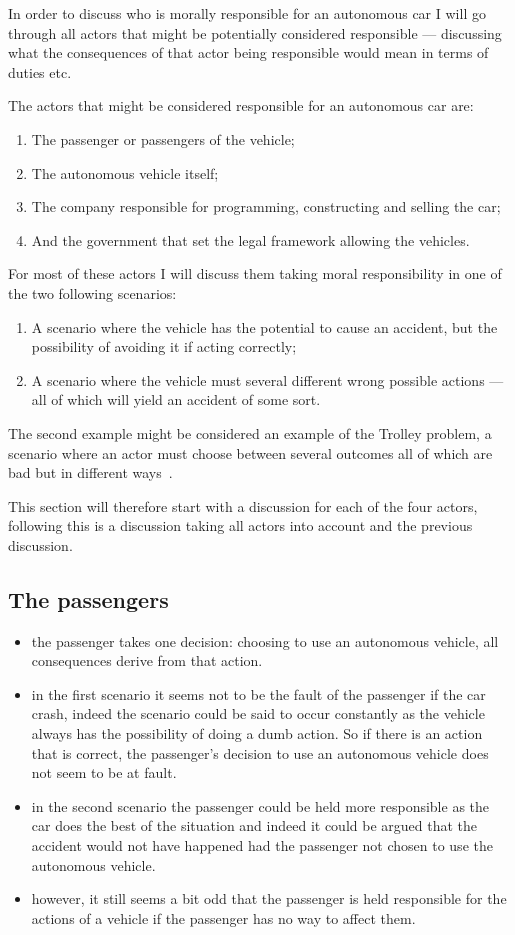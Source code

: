 In order to discuss who is morally responsible for an autonomous car I will
go through all actors that might be potentially considered responsible ---
discussing what the consequences of that actor being responsible would mean in
terms of duties etc.

The actors that might be considered responsible for an autonomous car are:
\begin{enumerate}
\item The passenger or passengers of the vehicle;
\item The autonomous vehicle itself;
\item The company responsible for programming, constructing and selling the car;
\item And the government that set the legal framework allowing the vehicles.
\end{enumerate}

For most of these actors I will discuss them taking moral responsibility in one
of the two following scenarios:
\begin{enumerate}
\item A scenario where the vehicle has the potential to cause an accident, but
  the possibility of avoiding it if acting correctly;
\item A scenario where the vehicle must several different wrong possible actions
  --- all of which will yield an accident of some sort.
\end{enumerate}
The second example might be considered an example of the Trolley problem, a
scenario where an actor must choose between several outcomes all of which are
bad but in different ways~\cite{2016_trolley_tp}.

This section will therefore start with a discussion for each of the four actors,
following this is a discussion taking all actors into account and the previous
discussion.

\subsection{The passengers}
\begin{itemize}
\item the passenger takes one decision: choosing to use an autonomous vehicle,
  all consequences derive from that action.
\item in the first scenario it seems not to be the fault of the passenger if the
  car crash, indeed the scenario could be said to occur constantly as the
  vehicle always has the possibility of doing a dumb action. So if there is an
  action that is correct, the passenger's
  decision to use an autonomous vehicle does not seem to be at fault.
\item in the second scenario the passenger could be held more responsible as the car does
  the best of the situation and indeed it could be argued that the accident
  would not have happened had the passenger not chosen to use the autonomous
  vehicle.
\item however, it still seems a bit odd that the passenger is held
  responsible for the actions of a vehicle if the passenger has no way to affect
  them.
\end{itemize}

